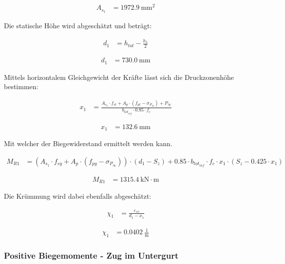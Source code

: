 \documentclass[
  11pt,
  letterpaper,
]{scrreprt}
\begin{document}
$$
\begin{aligned}
A_{s_{1}} &= 1972.9\ \mathrm{mm}^{2} \;
\end{aligned}
$$

Die statische Höhe wird abgeschätzt und beträgt:

$$
\begin{aligned}
d_{1} &= h_{tot} - \frac{ h_{5} }{ 2 } \; 
\end{aligned}
$$

$$
\begin{aligned}
d_{1} &= 730.0\ \mathrm{mm} \;
\end{aligned}
$$

Mittels horizontalem Gleichgewicht der Kräfte lässt sich die
Druckzonenhöhe bestimmen:

$$
\begin{aligned}
x_{1} &= \frac{ A_{s_{1}} \cdot f_{st} + A_{p} \cdot \left( f_{pt} - \sigma_{P_{\infty}} \right) + P_{\infty} }{ b_{tot_{inf}} \cdot 0.85 \cdot f_{c} } \; 
\end{aligned}
$$

$$
\begin{aligned}
x_{1} &= 132.6\ \mathrm{mm} \;
\end{aligned}
$$

Mit welcher der Biegewiderstand ermittelt werden kann.

$$
\begin{aligned}
M_{R1} &= \left( A_{s_{1}} \cdot f_{sy} + A_{p} \cdot \left( f_{py} - \sigma_{P_{\infty}} \right) \right) \cdot \left( d_{1} - S_{z} \right) + 0.85 \cdot b_{tot_{inf}} \cdot f_{c} \cdot x_{1} \cdot \left( S_{z} - 0.425 \cdot x_{1} \right) \; 
\end{aligned}
$$

$$
\begin{aligned}
M_{R1} &= 1315.4\ \mathrm{kN} \cdot \mathrm{m} \;
\end{aligned}
$$

Die Krümmung wird dabei ebenfalls abgeschätzt:

$$
\begin{aligned}
\chi_{1} &= \frac{ \varepsilon_{sv} }{ d_{1} - x_{1} } \; 
\end{aligned}
$$

$$
\begin{aligned}
\chi_{1} &= 0.0402\ \frac{1}{\mathrm{m}} \;
\end{aligned}
$$

\subsubsection{Positive Biegemomente - Zug im
Untergurt}\label{positive-biegemomente---zug-im-untergurt}
\end{document}
